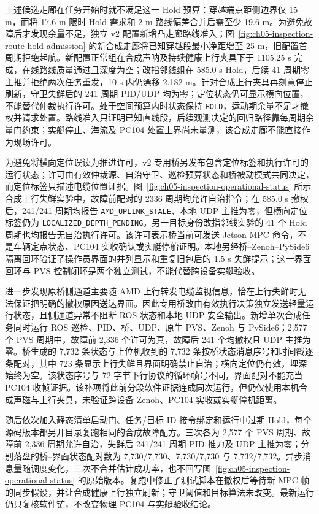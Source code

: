 上述候选走廊在任务开始时就不满足这一 Hold 预算：穿越端点距侧边界仅 15 m，而将 17.6 m 限时 Hold 需求和 2 m 路线偏差合并后需至少 19.6 m。为避免故障后才发现余量不足，独立 v2 配置新增凸走廊路线准入；图~\ref{fig:ch05-inspection-route-hold-admission} 的新合成走廊将已知穿越段最小净距增至 25 m，旧配置首周期拒绝起航。新配置正常组在合成声呐及持续健康上行夹具下于 1105.25 s 完成，在线路线质量通过且深度为空；改指邻线组在 585.0 s Hold，后续 41 周期零主推并拒绝两次任务重发，10 s 内仍漂移 2.182 m。针对合成上行夹具再刻意停止刷新，守卫失鲜后的 241 周期 PID/UDP 均为零；定位状态仍可显示横向位置，不能替代仲裁执行许可。处于空间预算内时状态保持 \texttt{HOLD}，运动期余量不足才撤权并请求处置。路线准入只证明已知直线段，后续观测决定的回归路径靠每周期余量门约束；实艇停止、海流及 PC104 处置上界尚未量测，该合成走廊不能直接作为现场许可。

为避免将横向定位误读为推进许可，v2 专用桥另发布包含定位标签和执行许可的运行状态；许可由有效仲裁源、自治守卫、巡检预算状态和桥被动模式共同决定，而定位标签只描述电缆位置证据。图~\ref{fig:ch05-inspection-operational-status} 所示合成上行失鲜实验中，故障前配对的 2336 周期均允许自治指令；在 585.0 s 撤权后，241/241 周期均报告 \texttt{AMD\_UPLINK\_STALE}、本地 UDP 主推为零，但横向定位标签仍为 \texttt{LOCALIZED\_DEPTH\_PENDING}。另一目标身份改指邻线实验的 41 个 Hold 周期也均报告无自治执行许可。该许可表示桥当前可发送 Jetson MPC 命令，不是车辆定点状态、PC104 实收确认或实艇停船证明。本地另经桥--Zenoh--PySide6 隔离回环验证了操作员界面的并列显示和重复旧包后的 1.5 s 失鲜提示；这一界面回环与 PVS 控制闭环是两个独立测试，不能代替跨设备实艇验收。

进一步发现原桥侧通道主要随 AMD 上行转发电缆监视信息，恰在上行失鲜时无法保证把明确的撤权原因送达界面。因此专用桥改由有效执行决策独立发送轻量运行状态，且侧通道异常不阻断 ROS 状态和本地 UDP 安全输出。新增单次合成任务同时运行 ROS 巡检、PID、桥、UDP、原生 PVS、Zenoh 与 PySide6；2,577 个 PVS 周期中，故障前 2,336 个许可为真，故障后 241 个均撤权且 UDP 主推为零。桥生成的 7,732 条状态与上位机收到的 7,732 条按桥状态消息序号和时间戳逐条配对，其中 723 条显示上行失鲜且界面明确禁止自治；横向定位仍有效，埋深始终为空。该状态序号与 72 字节下行协议的循环帧号不同，界面配对不能充当 PC104 收帧证据。该补项将此前分段软件证据连成同次运行，但仍仅使用本机合成声磁与上行夹具，未验证跨设备 Zenoh、PC104 实收或实艇停机距离。

随后依次加入静态清单启动门、任务/目标 ID 接令绑定和运行中过期 Hold，每个源码版本都另开目录复跑相同的合成故障配方。三次各为 2,577 个 PVS 周期、故障前 2,336 周期允许自治，失鲜后 241/241 周期 PID 推力及 UDP 主推为零；分别落盘的桥--界面状态配对数为 7,730/7,730、7,730/7,730 与 7,732/7,732。异步消息量随调度变化，三次不合并估计成功率，也不回写图~\ref{fig:ch05-inspection-operational-status} 的原始版本。复跑中修正了测试脚本在撤权后等待新 MPC 帧的同步假设，并让合成健康上行独立刷新；守卫阈值和目标算法未改变。最新运行仍只复核软件链，不改变物理 PC104 与实艇验收结论。

